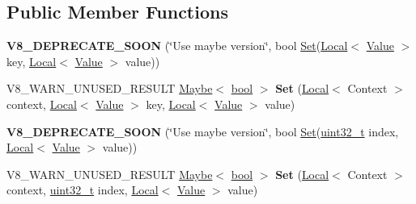 \subsection*{Public Member Functions}
\begin{DoxyCompactItemize}
\item 
\mbox{\label{classv8_1_1Object_a86333122230b703cabfb08d8a7d54a58}} 
{\bfseries V8\+\_\+\+D\+E\+P\+R\+E\+C\+A\+T\+E\+\_\+\+S\+O\+ON} (\char`\"{}Use maybe version\char`\"{}, bool \mbox{\hyperlink{classv8_1_1Set}{Set}}(\mbox{\hyperlink{classv8_1_1Local}{Local}}$<$ \mbox{\hyperlink{classv8_1_1Value}{Value}} $>$ key, \mbox{\hyperlink{classv8_1_1Local}{Local}}$<$ \mbox{\hyperlink{classv8_1_1Value}{Value}} $>$ value))
\item 
\mbox{\label{classv8_1_1Object_a61306713b33ac8ef3d31d28e54dc5bad}} 
V8\+\_\+\+W\+A\+R\+N\+\_\+\+U\+N\+U\+S\+E\+D\+\_\+\+R\+E\+S\+U\+LT \mbox{\hyperlink{classv8_1_1Maybe}{Maybe}}$<$ \mbox{\hyperlink{classbool}{bool}} $>$ {\bfseries Set} (\mbox{\hyperlink{classv8_1_1Local}{Local}}$<$ Context $>$ context, \mbox{\hyperlink{classv8_1_1Local}{Local}}$<$ \mbox{\hyperlink{classv8_1_1Value}{Value}} $>$ key, \mbox{\hyperlink{classv8_1_1Local}{Local}}$<$ \mbox{\hyperlink{classv8_1_1Value}{Value}} $>$ value)
\item 
\mbox{\label{classv8_1_1Object_a0c2305335e71c88d245dd1aa0060a2de}} 
{\bfseries V8\+\_\+\+D\+E\+P\+R\+E\+C\+A\+T\+E\+\_\+\+S\+O\+ON} (\char`\"{}Use maybe version\char`\"{}, bool \mbox{\hyperlink{classv8_1_1Set}{Set}}(\mbox{\hyperlink{classuint32__t}{uint32\+\_\+t}} index, \mbox{\hyperlink{classv8_1_1Local}{Local}}$<$ \mbox{\hyperlink{classv8_1_1Value}{Value}} $>$ value))
\item 
\mbox{\label{classv8_1_1Object_acb7b851b20f0216153fe109639c58218}} 
V8\+\_\+\+W\+A\+R\+N\+\_\+\+U\+N\+U\+S\+E\+D\+\_\+\+R\+E\+S\+U\+LT \mbox{\hyperlink{classv8_1_1Maybe}{Maybe}}$<$ \mbox{\hyperlink{classbool}{bool}} $>$ {\bfseries Set} (\mbox{\hyperlink{classv8_1_1Local}{Local}}$<$ Context $>$ context, \mbox{\hyperlink{classuint32__t}{uint32\+\_\+t}} index, \mbox{\hyperlink{classv8_1_1Local}{Local}}$<$ \mbox{\hyperlink{classv8_1_1Value}{Value}} $>$ value)
\item 
\mbox{\label{classv8_1_1Object_a826077e71c717f94deeeaa9bfca1b249}} 

\end{DoxyCompactItemize}
